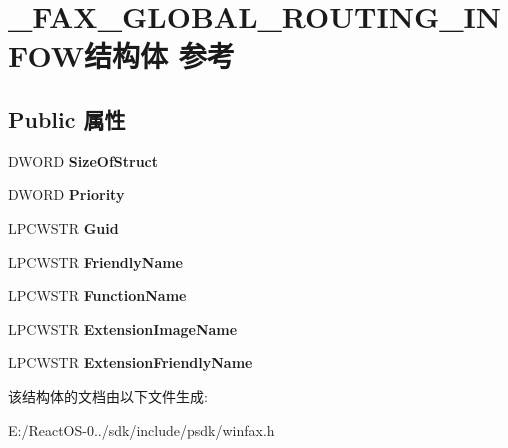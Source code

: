 \hypertarget{struct___f_a_x___g_l_o_b_a_l___r_o_u_t_i_n_g___i_n_f_o_w}{}\section{\+\_\+\+F\+A\+X\+\_\+\+G\+L\+O\+B\+A\+L\+\_\+\+R\+O\+U\+T\+I\+N\+G\+\_\+\+I\+N\+F\+O\+W结构体 参考}
\label{struct___f_a_x___g_l_o_b_a_l___r_o_u_t_i_n_g___i_n_f_o_w}
\subsection*{Public 属性}
\begin{DoxyCompactItemize}
\item 
\mbox{\label{struct___f_a_x___g_l_o_b_a_l___r_o_u_t_i_n_g___i_n_f_o_w_a55e63a5cfb7592ba1700b48174c0485f}} 
D\+W\+O\+RD {\bfseries Size\+Of\+Struct}
\item 
\mbox{\label{struct___f_a_x___g_l_o_b_a_l___r_o_u_t_i_n_g___i_n_f_o_w_a87cc3236315e8922a28b0caf12c6731d}} 
D\+W\+O\+RD {\bfseries Priority}
\item 
\mbox{\label{struct___f_a_x___g_l_o_b_a_l___r_o_u_t_i_n_g___i_n_f_o_w_afcbcc86485ea82bd238eba5f230c9c60}} 
L\+P\+C\+W\+S\+TR {\bfseries Guid}
\item 
\mbox{\label{struct___f_a_x___g_l_o_b_a_l___r_o_u_t_i_n_g___i_n_f_o_w_a5cf456e62c14f310bbdb8cd69cf467c6}} 
L\+P\+C\+W\+S\+TR {\bfseries Friendly\+Name}
\item 
\mbox{\label{struct___f_a_x___g_l_o_b_a_l___r_o_u_t_i_n_g___i_n_f_o_w_a17bf8c7c2ae019ad586bded15ff0a6a1}} 
L\+P\+C\+W\+S\+TR {\bfseries Function\+Name}
\item 
\mbox{\label{struct___f_a_x___g_l_o_b_a_l___r_o_u_t_i_n_g___i_n_f_o_w_a22459573af3ab8697336c0fd52e9e295}} 
L\+P\+C\+W\+S\+TR {\bfseries Extension\+Image\+Name}
\item 
\mbox{\label{struct___f_a_x___g_l_o_b_a_l___r_o_u_t_i_n_g___i_n_f_o_w_a7e6dae079db50cc44ee5ff7ffe3bbde3}} 
L\+P\+C\+W\+S\+TR {\bfseries Extension\+Friendly\+Name}
\end{DoxyCompactItemize}


该结构体的文档由以下文件生成\+:\begin{DoxyCompactItemize}
\item 
E\+:/\+React\+O\+S-\/0../sdk/include/psdk/winfax.\+h\end{DoxyCompactItemize}

